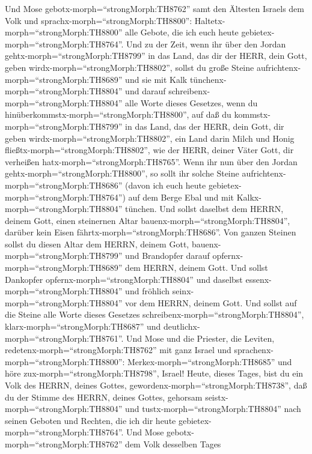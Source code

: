  Und Mose gebotx-morph=``strongMorph:TH8762'' samt den
Ältesten Israels dem Volk und sprachx-morph=``strongMorph:TH8800'':
Haltetx-morph=``strongMorph:TH8800'' alle Gebote, die ich euch heute
gebietex-morph=``strongMorph:TH8764''.  Und zu der Zeit,
wenn ihr über den Jordan gehtx-morph=``strongMorph:TH8799'' in das Land,
das dir der HERR, dein Gott, geben wirdx-morph=``strongMorph:TH8802'',
sollst du große Steine aufrichtenx-morph=``strongMorph:TH8689'' und sie
mit Kalk tünchenx-morph=``strongMorph:TH8804''  und darauf
schreibenx-morph=``strongMorph:TH8804'' alle Worte dieses Gesetzes, wenn
du hinüberkommstx-morph=``strongMorph:TH8800'', auf daß du
kommstx-morph=``strongMorph:TH8799'' in das Land, das der HERR, dein
Gott, dir geben wirdx-morph=``strongMorph:TH8802'', ein Land darin Milch
und Honig fließtx-morph=``strongMorph:TH8802'', wie der HERR, deiner
Väter Gott, dir verheißen hatx-morph=``strongMorph:TH8765''.
 Wenn ihr nun über den Jordan
gehtx-morph=``strongMorph:TH8800'', so sollt ihr solche Steine
aufrichtenx-morph=``strongMorph:TH8686'' (davon ich euch heute
gebietex-morph=``strongMorph:TH8764'') auf dem Berge Ebal und mit
Kalkx-morph=``strongMorph:TH8804'' tünchen.  Und sollst
daselbst dem HERRN, deinem Gott, einen steinernen Altar
bauenx-morph=``strongMorph:TH8804'', darüber kein Eisen
fährtx-morph=``strongMorph:TH8686''.  Von ganzen Steinen
sollst du diesen Altar dem HERRN, deinem Gott,
bauenx-morph=``strongMorph:TH8799'' und Brandopfer darauf
opfernx-morph=``strongMorph:TH8689'' dem HERRN, deinem Gott.
 Und sollst Dankopfer opfernx-morph=``strongMorph:TH8804''
und daselbst essenx-morph=``strongMorph:TH8804'' und fröhlich
seinx-morph=``strongMorph:TH8804'' vor dem HERRN, deinem Gott.
 Und sollst auf die Steine alle Worte dieses Gesetzes
schreibenx-morph=``strongMorph:TH8804'',
klarx-morph=``strongMorph:TH8687'' und
deutlichx-morph=``strongMorph:TH8761''.  Und Mose und die
Priester, die Leviten, redetenx-morph=``strongMorph:TH8762'' mit ganz
Israel und sprachenx-morph=``strongMorph:TH8800'':
Merkex-morph=``strongMorph:TH8685'' und höre
zux-morph=``strongMorph:TH8798'', Israel! Heute, dieses Tages, bist du
ein Volk des HERRN, deines Gottes,
gewordenx-morph=``strongMorph:TH8738'',  daß du der Stimme
des HERRN, deines Gottes, gehorsam seistx-morph=``strongMorph:TH8804''
und tustx-morph=``strongMorph:TH8804'' nach seinen Geboten und Rechten,
die ich dir heute gebietex-morph=``strongMorph:TH8764''. 
Und Mose gebotx-morph=``strongMorph:TH8762'' dem Volk desselben Tages
